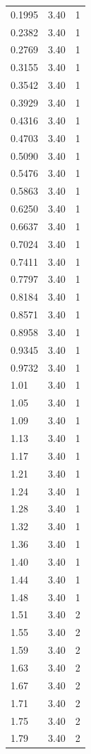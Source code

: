 \begin{longtable}{lrr}
  0.1995 & 3.40 & 1 \\
  0.2382 & 3.40 & 1 \\
  0.2769 & 3.40 & 1 \\
  0.3155 & 3.40 & 1 \\
  0.3542 & 3.40 & 1 \\
  0.3929 & 3.40 & 1 \\
  0.4316 & 3.40 & 1 \\
  0.4703 & 3.40 & 1 \\
  0.5090 & 3.40 & 1 \\
  0.5476 & 3.40 & 1 \\
  0.5863 & 3.40 & 1 \\
  0.6250 & 3.40 & 1 \\
  0.6637 & 3.40 & 1 \\
  0.7024 & 3.40 & 1 \\
  0.7411 & 3.40 & 1 \\
  0.7797 & 3.40 & 1 \\
  0.8184 & 3.40 & 1 \\
  0.8571 & 3.40 & 1 \\
  0.8958 & 3.40 & 1 \\
  0.9345 & 3.40 & 1 \\
  0.9732 & 3.40 & 1 \\
  1.01 & 3.40 & 1 \\
  1.05 & 3.40 & 1 \\
  1.09 & 3.40 & 1 \\
  1.13 & 3.40 & 1 \\
  1.17 & 3.40 & 1 \\
  1.21 & 3.40 & 1 \\
  1.24 & 3.40 & 1 \\
  1.28 & 3.40 & 1 \\
  1.32 & 3.40 & 1 \\
  1.36 & 3.40 & 1 \\
  1.40 & 3.40 & 1 \\
  1.44 & 3.40 & 1 \\
  1.48 & 3.40 & 1 \\
  1.51 & 3.40 & 2 \\
  1.55 & 3.40 & 2 \\
  1.59 & 3.40 & 2 \\
  1.63 & 3.40 & 2 \\
  1.67 & 3.40 & 2 \\
  1.71 & 3.40 & 2 \\
  1.75 & 3.40 & 2 \\
  1.79 & 3.40 & 2 \\

\end{longtable}
